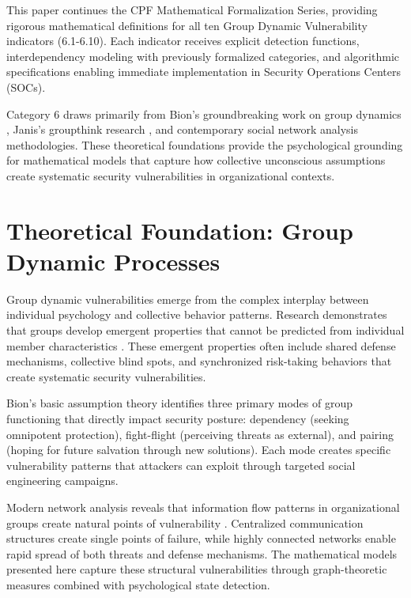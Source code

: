 \documentclass[11pt,a4paper]{article}
\begin{document}
This paper continues the CPF Mathematical Formalization Series, providing rigorous mathematical definitions for all ten Group Dynamic Vulnerability indicators (6.1-6.10). Each indicator receives explicit detection functions, interdependency modeling with previously formalized categories, and algorithmic specifications enabling immediate implementation in Security Operations Centers (SOCs).

Category 6 draws primarily from Bion's groundbreaking work on group dynamics \cite{bion1961}, Janis's groupthink research \cite{janis1971}, and contemporary social network analysis methodologies. These theoretical foundations provide the psychological grounding for mathematical models that capture how collective unconscious assumptions create systematic security vulnerabilities in organizational contexts.

\section{Theoretical Foundation: Group Dynamic Processes}

Group dynamic vulnerabilities emerge from the complex interplay between individual psychology and collective behavior patterns. Research demonstrates that groups develop emergent properties that cannot be predicted from individual member characteristics \cite{arrow2000}. These emergent properties often include shared defense mechanisms, collective blind spots, and synchronized risk-taking behaviors that create systematic security vulnerabilities.

Bion's \cite{bion1961} basic assumption theory identifies three primary modes of group functioning that directly impact security posture: dependency (seeking omnipotent protection), fight-flight (perceiving threats as external), and pairing (hoping for future salvation through new solutions). Each mode creates specific vulnerability patterns that attackers can exploit through targeted social engineering campaigns.

Modern network analysis reveals that information flow patterns in organizational groups create natural points of vulnerability \cite{watts1998}. Centralized communication structures create single points of failure, while highly connected networks enable rapid spread of both threats and defense mechanisms. The mathematical models presented here capture these structural vulnerabilities through graph-theoretic measures combined with psychological state detection.
\end{document}
